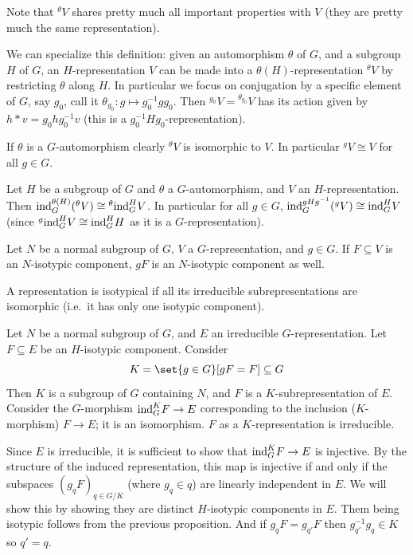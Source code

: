 \edefn

Note that ${}^\theta V$ shares pretty much all important properties with $V$ (they are pretty much the same representation).

We can specialize this definition: given an automorphism $\theta$ of $G$, and a subgroup $H$ of $G$, an $H$-representation $V$ can be made into a $\theta(H)$-representation ${}^\theta V$ by
restricting $\theta$ along $H$.
In particular we focus on conjugation by a specific element of $G$, say $g_0$, call it $\theta_{g_0}\colon g\mapsto g_0^{-1}gg_0$.
Then ${}^{g_0}V={}^{\theta_{g_0}}V$ has its action given by $h*v=g_0hg_0^{-1}v$ (this is a $g_0^{-1}Hg_0$-representation).

If $\theta$ is a $G$-automorphism clearly ${}^\theta V$ is isomorphic to $V$.
In particular ${}^gV\cong V$ for all $g\in G$.

\bprop

    Let $H$ be a subgroup of $G$ and $\theta$ a $G$-automorphism, and $V$ an $H$-representation.
    Then ${\rm ind}^{\theta(H)}_G({}^\theta V)\cong{}^\theta{\rm ind}^H_GV$.
    In particular for all $g\in G$, ${\rm ind}^{gHg^{-1}}_G({}^gV)\cong{\rm ind}^H_GV$ (since ${}^g{\rm ind}^H_GV\cong{\rm ind}^H_GH$ as it is a $G$-representation).

\eprop

\bprop

    Let $N$ be a normal subgroup of $G$, $V$ a $G$-representation, and $g\in G$.
    If $F\subseteq V$ is an $N$-isotypic component, $gF$ is an $N$-isotypic component as well.

\eprop

\bdefn

    A representation is {\emphcolor isotypical} if all its irreducible subrepresentations are isomorphic (i.e.\ it has only one isotypic component).

\edefn

\blemm

    Let $N$ be a normal subgroup of $G$, and $E$ an irreducible $G$-representation.
    Let $F\subseteq E$ be an $H$-isotypic component.
    Consider
    $$ K = \set{g\in G}[gF=F] \subseteq G $$
    Then $K$ is a subgroup of $G$ containing $N$, and $F$ is a $K$-subrepresentation of $E$.
    Consider the $G$-morphism ${\rm ind}^K_GF\to E$ corresponding to the inclusion ($K$-morphism) $F\to E$; it is an isomorphism.
    $F$ as a $K$-representation is irreducible.

\elemm

\bproof

    Since $E$ is irreducible, it is sufficient to show that ${\rm ind}^K_GF\to E$ is injective.
    By the structure of the induced representation, this map is injective if and only if the subspaces $(g_qF)_{q\in G/K}$ (where $g_q\in q$) are linearly independent in $E$.
    We will show this by showing they are distinct $H$-isotypic components in $E$.
    Them being isotypic follows from the previous proposition.
    And if $g_qF=g_{q'}F$ then $g_{q'}^{-1}g_q\in K$ so $q'=q$.

